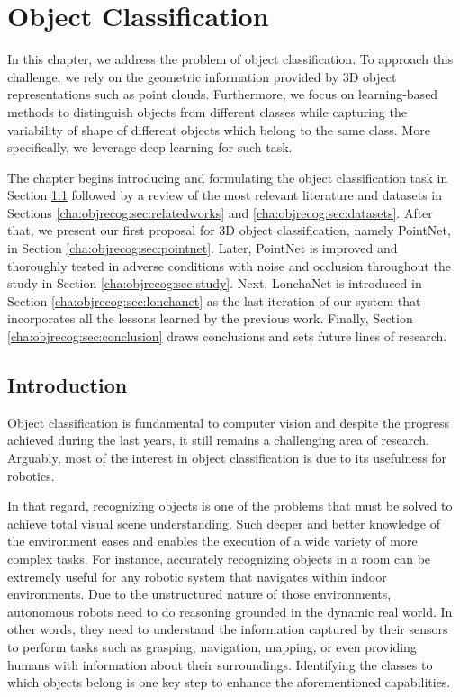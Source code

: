 \chapter{Object Classification}
\label{cha:objrecog}

\begin{chapterabstract}
In this chapter, we address the problem of object classification. To approach this challenge, we rely on the geometric information provided by 3D object representations such as point clouds. Furthermore, we focus on learning-based methods to distinguish objects from different classes while capturing the variability of shape of different objects which belong to the same class. More specifically, we leverage deep learning for such task.

The chapter begins introducing and formulating the object classification task in Section \ref{cha:objrecog:sec:introduction} followed by a review of the most relevant literature and datasets in Sections \ref{cha:objrecog:sec:relatedworks} and \ref{cha:objrecog:sec:datasets}. After that, we present our first proposal for 3D object classification, namely PointNet, in Section \ref{cha:objrecog:sec:pointnet}. Later, PointNet is improved and thoroughly tested in adverse conditions with noise and occlusion throughout the study in Section \ref{cha:objrecog:sec:study}. Next, LonchaNet is introduced in Section \ref{cha:objrecog:sec:lonchanet} as the last iteration of our system that incorporates all the lessons learned by the previous work. Finally, Section \ref{cha:objrecog:sec:conclusion} draws conclusions and sets future lines of research.
\end{chapterabstract}

\clearpage

\section{Introduction}
\label{cha:objrecog:sec:introduction}

Object classification is fundamental to computer vision and despite the progress achieved during the last years, it still remains a challenging area of research. Arguably, most of the interest in object classification is due to its usefulness for robotics.

In that regard, recognizing objects is one of the problems that must be solved to achieve total visual scene understanding. Such deeper and better knowledge of the environment eases and enables the execution of a wide variety of more complex tasks. For instance, accurately recognizing objects in a room can be extremely useful for any robotic system that navigates within indoor environments. Due to the unstructured nature of those environments, autonomous robots need to do reasoning grounded in the dynamic real world. In other words, they need to understand the information captured by their sensors to perform tasks such as grasping, navigation, mapping, or even providing humans with information about their surroundings. Identifying the classes to which objects belong is one key step to enhance the aforementioned capabilities.

